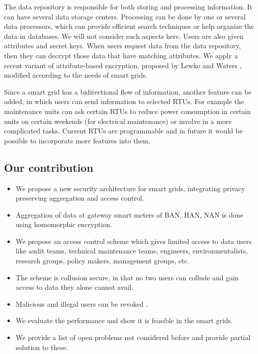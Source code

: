 \documentclass[conference]{IEEEtran}[10pt]
\begin{document}
The data repository is responsible for both storing and processing information.
It can have several data storage centers. 
Processing can be done by one or several data processors, which can provide efficient search techniques or help organize the data in databases. 
We will not consider such aspects here. 
Users are also given attributes and secret keys. 
When users request data from the data repository, then they can decrypt those data that have matching attributes.
We apply a recent variant of attribute-based encryption, proposed by Lewko and Waters \cite{LW11}, modified according to the needs of smart grids.

Since a smart grid has a bidirectional flow of information, another feature can be added, in which users can send information to
selected RTUs.  
For example the maintenance units can ask certain RTUs  to reduce power consumption in certain  units on certain  weekends (for electrical maintenance)
or involve in a more complicated tasks.
Current RTUs are programmable and in future it would be possible to incorporate more features into them.



\subsection{Our contribution}
\label{subsec:contribution}
\begin{itemize}
\item We propose a new security architecture for smart grids, integrating privacy preserving aggregation and access control.
\item Aggregation of data at gateway smart meters of BAN, HAN, NAN is done using homomorphic encryption.
\item We propose an access control scheme which 
gives limited access to data users like audit teams, technical maintenance teams, engineers, environmentalists, research groups, policy makers, management groups, etc.
\item The scheme is collusion secure, in that no two users can collude and gain access to data they alone cannot avail.
\item Malicious and illegal users can be revoked .
\item We evaluate the performance and show it is feasible in the smart grids.
\item We provide a list of open problems not considered before and provide partial solution to these.
\end{itemize}
\end{document}
